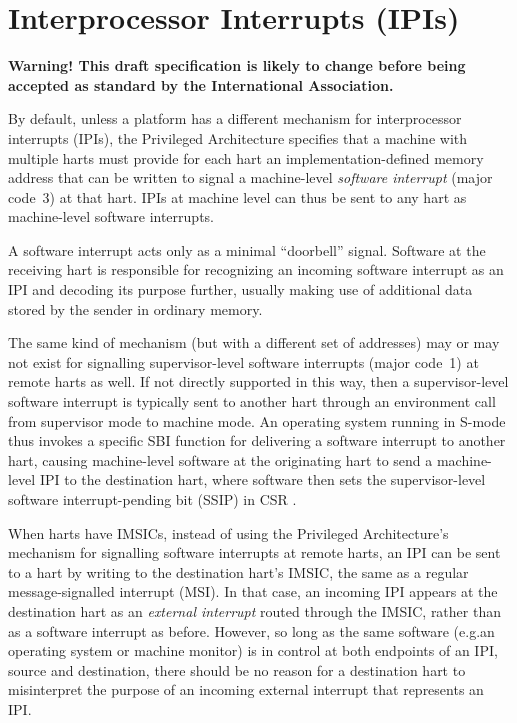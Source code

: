 
\chapter{Interprocessor Interrupts (IPIs)}
\label{ch:IPIs}

\textbf{%
Warning!
This draft specification is likely to change before being accepted as
standard by the {\RISCV} International Association.%
}
\bigskip

By default, unless a platform has a different mechanism for
interprocessor interrupts (IPIs), the {\RISCV} Privileged Architecture
specifies that a machine with multiple harts must provide for each hart
an implementation-defined memory address that can be written to signal
a machine-level \emph{software interrupt} (major code~3) at that hart.
IPIs at machine level can thus be sent to any hart as machine-level
software interrupts.

\begin{commentary}
A {\RISCV} software interrupt acts only as a minimal ``doorbell''
signal.
Software at the receiving hart is responsible for recognizing an
incoming software interrupt as an IPI and decoding its purpose further,
usually making use of additional data stored by the sender in ordinary
memory.
\end{commentary}

The same kind of mechanism (but with a different set of addresses) may
or may not exist for signalling supervisor-level software interrupts
(major code~1) at remote harts as well.
If not directly supported in this way, then a supervisor-level software
interrupt is typically sent to another hart through an environment call
from supervisor mode to machine mode.
An operating system running in \mbox{S-mode} thus invokes a specific
SBI function for delivering a software interrupt to another hart,
causing machine-level software at the originating hart to send a
machine-level IPI to the destination hart, where software then sets the
supervisor-level software interrupt-pending bit (SSIP) in CSR .

When harts have IMSICs, instead of using the Privileged Architecture's
mechanism for signalling software interrupts at remote harts, an IPI
can be sent to a hart by writing to the destination hart's IMSIC, the
same as a regular message-signalled interrupt (MSI)\@.
In that case, an incoming IPI appears at the destination hart as an
\emph{external interrupt} routed through the IMSIC, rather than as a
software interrupt as before.
However, so long as the same software (e.g.\@ an operating system or
machine monitor) is in control at both endpoints of an IPI, source
and destination, there should be no reason for a destination hart
to misinterpret the purpose of an incoming external interrupt that
represents an IPI.

